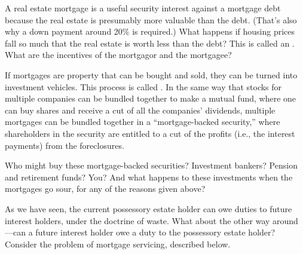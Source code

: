 \item A real estate mortgage is a useful security interest against a mortgage
debt because the real estate is presumably more valuable than the debt. (That's
also why a down payment around 20\% is required.) What happens if housing prices
fall so much that the real estate is worth less than the debt? This is called an
. What are the incentives of the mortgagor and the
mortgagee?

\item If mortgages are property that can be bought and sold, they can be turned
into investment vehicles. This
process is called
. In the same way
that stocks for multiple companies can be bundled together to make a mutual
fund, where one can buy shares and receive a cut of all the companies'
dividends, multiple mortgages can be bundled together in a ``mortgage-backed
security,'' where shareholders in the security are entitled to a cut of the
profits (i.e., the interest payments) from the
foreclosures.

Who might buy these mortgage-backed securities? Investment bankers? Pension and
retirement funds? You? And what happens to these investments when the mortgages
go sour, for any of the reasons given above?


\item As we have seen, the current possessory estate holder can owe duties to
future interest holders, under the doctrine of waste. What about the other way
around---can a future interest holder owe a duty to the possessory estate
holder? Consider the problem of mortgage servicing, described below.




